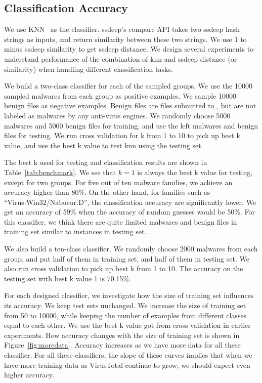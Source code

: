 \subsection{Classification Accuracy}

We use KNN~\cite{knn} as the classifier.
ssdeep's compare API takes two ssdeep hash strings as inputs, 
and return similarity between these two strings. 
We use 1 to minus ssdeep similarity to get ssdeep distance.  
We design several experiments to understand performance of 
the combination of knn and ssdeep 
distance (or similarity) when handling different classification tasks. 

We build a two-class classifier for each of the sampled groups. 
We use the 10000 sampled malwares from each group as positive examples. 
We sample 10000 benign files as negative examples. 
Benign files are files submitted to \vt{}, but are not labeled as malwares by any anti-virus engines. 
We randomly choose 5000 malwares and 5000 benign files for training, 
and use the left malwares and benign files for testing. 
We run cross validation for k from 1 to 10 to pick up best k value, 
and use the best k value to test knn using the testing set. 

The best k used for testing and classification results are shown in Table~\ref{tab:benchmark}.
We see that $k=1$ is always the best k value for testing, except for two groups.
For five out of
ten malware families, we achieve an accuracy higher than 80\%.
On the other hand, for
families such as ``Virus:Win32/Nabucur.D'',
the classification accuracy are significantly
lower. We get an accuracy of 59\% when
the accuracy of random guesses would be 50\%.
For this classifier, we think there are quite limited malwares and benign files in training set similar to instances in testing set. 

We also build a ten-class classifier.
We randomly choose 2000 malwares from each group, 
and put half of them in training set, and half of them in testing set. 
We also run cross validation to pick up best k from 1 to 10. 
The accuracy on the testing set with best k value 1 is 70.15\%. 





For each designed classifier, we investigate 
how the size of training set influences its accuracy.
We keep test sets unchanged.  
We increase the size of training set from 50 to 10000, 
while keeping the number of examples from different classes equal to each other.  
We use the best k value got from cross validation in earlier experiments.
How accuracy changes with the size of training set is shown in Figure~\ref{fig:moredata}. 
Accuracy increases as we have more data for all these classifier. For all these classifiers, the slope of these curves implies that
when we have more training data as VirusTotal
continue to grow, we should expect even higher
accuracy.

